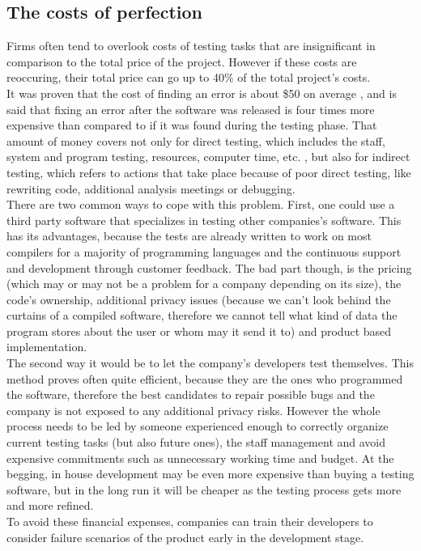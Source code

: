 \subsection{The costs of perfection}
Firms often tend to overlook costs of testing tasks that are insignificant in comparison to the total price of the project. However if these costs are reoccuring, their total price can go up to 40\% of the total project's costs\cite{8822082}.\\
It was proven that the cost of finding an error is about \$50 on average \cite{10.1145/1010773.1010774}, and is said that fixing an error after the software was released is four times more expensive than compared to if it was found during the testing phase\cite{10.1007/978-981-10-8848-3_46}. That amount of money covers not only for direct testing, which includes the staff, system and program testing, resources, computer time, etc. , but also for indirect testing, which refers to actions that take place because of poor direct testing, like rewriting code, additional analysis meetings or debugging.\\
There are two common ways to cope with this problem. First, one could use a third party software that specializes in testing other companies's software. This has its advantages, because the tests are already written to work on most compilers for a majority of programming languages and the continuous support and development through customer feedback. The bad part though, is the pricing (which may or may not be a problem for a company depending on its size), the code's ownership, additional privacy issues (because we can't look behind the curtains of a compiled software, therefore we cannot tell what kind of data the program stores about the user or whom may it send it to) and product based implementation.\\
The second way it would be to let the company's developers test themselves. This method proves often quite efficient, because they are the ones who programmed the software, therefore the best candidates to repair possible bugs and the company is not exposed to any additional privacy risks. However the whole process needs to be led by someone experienced enough to correctly organize current testing tasks (but also future ones), the staff management and avoid expensive commitments such as unnecessary working time and budget. At the begging, in house development may be even more expensive than buying a testing software, but in the long run it will be cheaper as the testing process gets more and more refined.\\
To avoid these financial expenses, companies can train their developers to consider failure scenarios of the product early in the development stage.
\label{costs}
